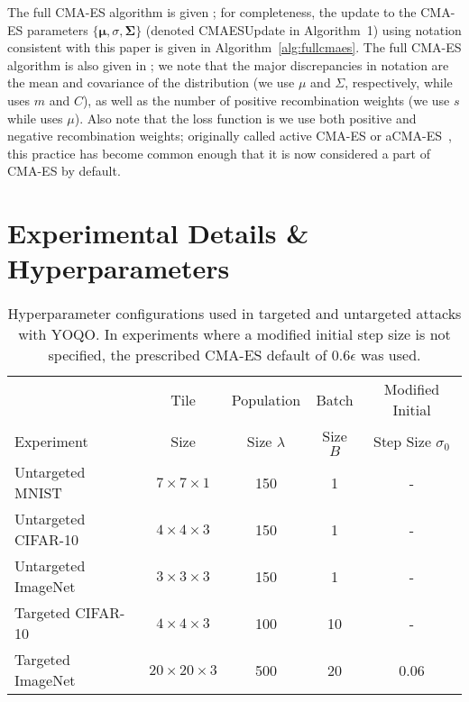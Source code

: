 \documentclass[letterpaper]{article}
\begin{document}
	The full CMA-ES algorithm is given \cite[Appendix A]{hansen2016cma}; for completeness, the update to the CMA-ES parameters $\{\boldsymbol{\mu}, \sigma, \bm{\Sigma}\}$ (denoted CMAESUpdate in Algorithm~1) using notation consistent with this paper is given in Algorithm~\ref{alg:fullcmaes}. The full CMA-ES algorithm is also given in \cite[Appendix A]{hansen2016cma}; we note that the major discrepancies in notation are the mean and covariance of the distribution (we use $\mu$ and $\Sigma$, respectively, while \cite{hansen2016cma} uses $m$ and $C$), as well as the number of positive recombination weights (we use $s$ while \cite{hansen2016cma} uses $\mu$). Also note that the loss function is  we use both positive and negative recombination weights; originally called active CMA-ES or aCMA-ES~\cite{jastrebski2006improving}, this practice has become common enough that it is now considered a part of CMA-ES by default.
	
	\newpage
	
	\section{Experimental Details \& Hyperparameters}
	
	\begin{table*}[t]
		\centering
		\begin{tabular}{lcccc}
			\toprule
			& Tile & Population  & Batch  & Modified Initial  \\
			Experiment & Size & Size $\lambda$ & Size $B$ & Step Size $\sigma_0$  \\
			\midrule
			Untargeted MNIST      &   $7 \times 7 \times 1$  & 150 &  1 & -    \\
			Untargeted CIFAR-10   &   $4 \times 4 \times 3$  & 150 &  1 & -    \\ 
			Untargeted ImageNet   &   $3 \times 3 \times 3$  & 150 &  1 & -    \\ 
			Targeted CIFAR-10     &   $4 \times 4 \times 3$  & 100 & 10 & -    \\ 
			Targeted ImageNet     & $20 \times 20 \times 3$  & 500 & 20 & 0.06 \\ 
			\bottomrule
		\end{tabular}
		\caption{Hyperparameter configurations used in targeted and untargeted attacks with YOQO. In experiments where a modified initial step size is not specified, the prescribed CMA-ES default of $0.6\epsilon$ was used.}
		\label{yoqo_params}
	\end{table*}
	
\end{document}
